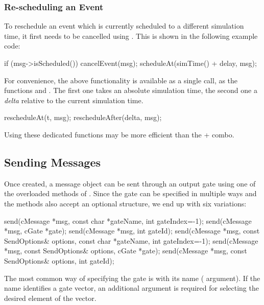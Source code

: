 \subsubsection{Re-scheduling an Event}
\label{sec:simple-modules:rescheduling}

To reschedule an event which is currently scheduled to a different
simulation time, it first needs to be cancelled using .
This is shown in the following example code:

\begin{cpp}
if (msg->isScheduled())
    cancelEvent(msg);
scheduleAt(simTime() + delay, msg);
\end{cpp}

For convenience, the above functionality is available as a single
call, as the functions  and .
The first one takes an absolute simulation time, the second one a
\textit{delta} relative to the current simulation time.

\begin{cpp}
rescheduleAt(t, msg);
rescheduleAfter(delta, msg);
\end{cpp}

Using these dedicated functions may be more efficient than the
+ combo.


\subsection{Sending Messages}
\label{sec:simple-modules:sending-messages}

Once created, a message object can be sent through an output
gate using one of the overloaded  methods
of . Since the gate can be specified in multiple ways
and the methods also accept an optional  structure,
we end up with six variations:

\begin{cpp}
send(cMessage *msg, const char *gateName, int gateIndex=-1);
send(cMessage *msg, cGate *gate);
send(cMessage *msg, int gateId);
send(cMessage *msg, const SendOptions& options, const char *gateName, int gateIndex=-1);
send(cMessage *msg, const SendOptions& options, cGate *gate);
send(cMessage *msg, const SendOptions& options, int gateId);
\end{cpp}

The most common way of specifying the gate is with its name (
argument). If the name identifies a gate vector, an additional 
argument is required for selecting the desired element of the vector.

